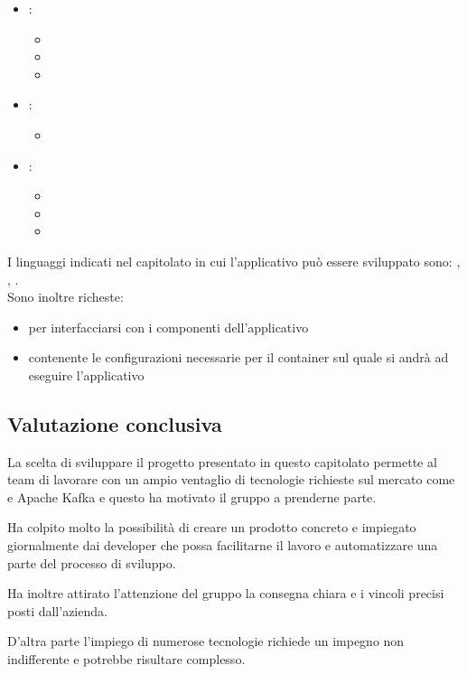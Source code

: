    \begin{itemize}
        \item {}:
        \begin{itemize}
            \item {}
            \item {}
            \item {}
        \end{itemize}
        \item {}:
        \begin{itemize}
            \item {}
        \end{itemize}
        \item {}:
        \begin{itemize}
            \item {}
            \item {}
            \item {}
        \end{itemize}
    \end{itemize}
    I linguaggi indicati nel capitolato in cui l'applicativo può essere sviluppato sono: , , .\\
    Sono inoltre richeste:
    \begin{itemize}
        \item {} per interfacciarsi con i componenti dell'applicativo
        \item {} contenente le configurazioni necessarie per il container sul quale si andrà ad eseguire l'applicativo
    \end{itemize}

    \subsection{Valutazione conclusiva}
    La scelta di sviluppare il progetto presentato in questo capitolato permette al team di lavorare con un ampio ventaglio di tecnologie
    richieste sul mercato come  e Apache Kafka e questo ha motivato il gruppo a prenderne parte.\par
    Ha colpito molto la possibilità di creare un prodotto concreto e impiegato giornalmente dai developer che possa facilitarne il lavoro
    e automatizzare una parte del processo di sviluppo.\par
    Ha inoltre attirato l'attenzione del gruppo la consegna chiara e i vincoli precisi posti dall'azienda.\par
    D'altra parte l'impiego di numerose tecnologie richiede un impegno non indifferente e potrebbe risultare complesso.
